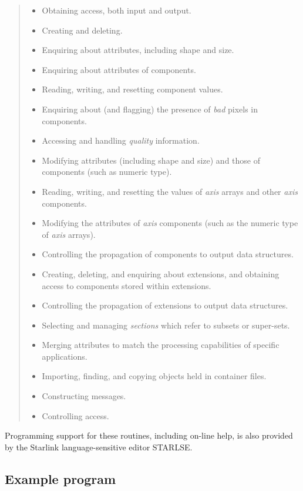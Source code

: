 \begin{small}
\begin{quote}
\begin{itemize}
\item Obtaining access, both input and output.
\item Creating and deleting.
\item Enquiring about attributes, including shape and size.
\item Enquiring about attributes of components.
\item Reading, writing, and resetting component values.
\item Enquiring about (and flagging) the presence of {\em bad\/} pixels in
 components.
\item Accessing and handling {\em quality\/} information.
\item Modifying attributes (including shape and size) and those of components
 (such as numeric type).
\item Reading, writing, and resetting the values of {\em axis\/} arrays and
 other {\em axis\/} components.
\item Modifying the attributes of {\em axis} components (such as the numeric
 type of {\em axis\/} arrays).
\item Controlling the propagation of components to output data structures.
\item Creating, deleting, and enquiring about extensions, and obtaining
 access to components stored within extensions.
\item Controlling the propagation of extensions to output data structures.
\item Selecting and managing {\em sections\/} which refer to subsets or
 super-sets.
\item Merging attributes to match the processing capabilities of specific
 applications.
\item Importing, finding, and copying objects held in container files.
\item Constructing messages.
\item Controlling access.
\end{itemize}
\end{quote}
\end{small}

Programming support for these routines, including on-line help, is also
provided by the Starlink language-sensitive editor STARLSE.

\subsection{Example program}
\label{S_addexample}

